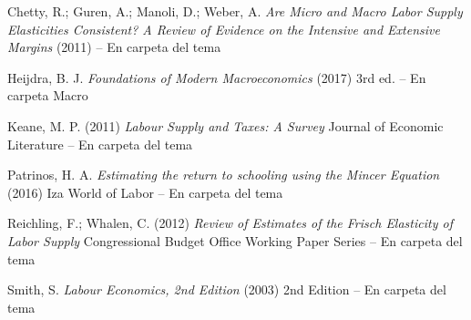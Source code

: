 \documentclass{nuevotema}
\begin{document}
Chetty, R.; Guren, A.; Manoli, D.; Weber, A. \textit{Are Micro and Macro Labor Supply Elasticities Consistent? A Review of Evidence on the Intensive and Extensive Margins} (2011) -- En carpeta del tema

Heijdra, B. J. \textit{Foundations of Modern Macroeconomics} (2017) 3rd ed. -- En carpeta Macro

Keane, M. P. (2011) \textit{Labour Supply and Taxes: A Survey} Journal of Economic Literature -- En carpeta del tema

Patrinos, H. A. \textit{Estimating the return to schooling using the Mincer Equation} (2016) Iza World of Labor -- En carpeta del tema

Reichling, F.; Whalen, C. (2012) \textit{Review of Estimates of the Frisch Elasticity of Labor Supply} Congressional Budget Office Working Paper Series -- En carpeta del tema

Smith, S. \textit{Labour Economics, 2nd Edition} (2003) 2nd Edition -- En carpeta del tema
\end{document}

